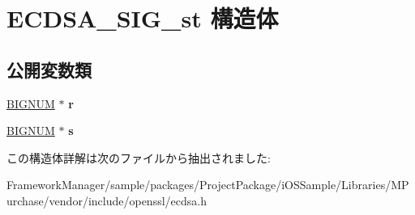 \hypertarget{struct_e_c_d_s_a___s_i_g__st}{}\section{E\+C\+D\+S\+A\+\_\+\+S\+I\+G\+\_\+st 構造体}
\label{struct_e_c_d_s_a___s_i_g__st}
\subsection*{公開変数類}
\begin{DoxyCompactItemize}
\item 
\hypertarget{struct_e_c_d_s_a___s_i_g__st_aa4a144f7356b7e62243af763e584fd0f}{}\hyperlink{structbignum__st}{B\+I\+G\+N\+U\+M} $\ast$ {\bfseries r}\label{struct_e_c_d_s_a___s_i_g__st_aa4a144f7356b7e62243af763e584fd0f}

\item 
\hypertarget{struct_e_c_d_s_a___s_i_g__st_a784f9869eb36cd84ea750b3ac58075ca}{}\hyperlink{structbignum__st}{B\+I\+G\+N\+U\+M} $\ast$ {\bfseries s}\label{struct_e_c_d_s_a___s_i_g__st_a784f9869eb36cd84ea750b3ac58075ca}

\end{DoxyCompactItemize}


この構造体詳解は次のファイルから抽出されました\+:\begin{DoxyCompactItemize}
\item 
Framework\+Manager/sample/packages/\+Project\+Package/i\+O\+S\+Sample/\+Libraries/\+M\+Purchase/vendor/include/openssl/ecdsa.\+h\end{DoxyCompactItemize}
